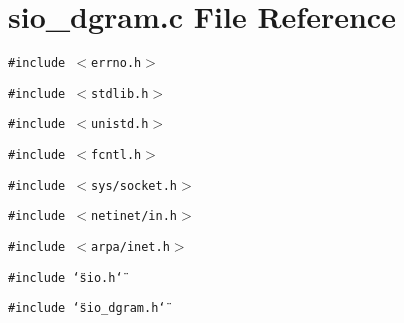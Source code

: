 \section{sio\_\-dgram.c File Reference}
\label{sio__dgram_8c}
{\tt \#include $<$errno.h$>$}\par
{\tt \#include $<$stdlib.h$>$}\par
{\tt \#include $<$unistd.h$>$}\par
{\tt \#include $<$fcntl.h$>$}\par
{\tt \#include $<$sys/socket.h$>$}\par
{\tt \#include $<$netinet/in.h$>$}\par
{\tt \#include $<$arpa/inet.h$>$}\par
{\tt \#include \char`\"{}sio.h\char`\"{}}\par
{\tt \#include \char`\"{}sio\_\-dgram.h\char`\"{}}\par
